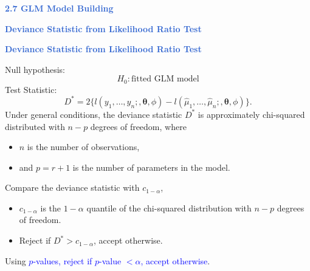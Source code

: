\documentclass[aspectratio=169,professionalfonts,mathserif]{beamer}
\newcommand{\highlight}[1]{\textcolor{Highlight}{\bf #1}}
\renewcommand{\(}{\left(}
\renewcommand{\)}{\right)}
\renewcommand{\[}{\left[}
\renewcommand{\]}{\right]}
\newcommand{\mytitle}[1]{\vspace*{-1mm}%
  \centerline{\highlight{\Large #1}}\vspace*{3mm}}
\newenvironment{slidebox}{%
  \begin{minipage}[c][7.5cm][t]{14.4cm}\raggedright}{%
  \end{minipage}}
\begin{document}
\begin{frame}\begin{slidebox}
  \mytitle{2.7 GLM Model Building}
\end{slidebox}\end{frame}

\begin{frame}\begin{slidebox}
  \mytitle{Deviance Statistic from Likelihood Ratio Test}
\end{slidebox}\end{frame}


\begin{frame}\begin{slidebox}
  \mytitle{Deviance Statistic from Likelihood Ratio Test}
  Null hypothesis: 
  $$H_0: \text{fitted GLM model} $$
  \pause
  Test Statistic:
  \begin{equation*}
    D^* = 2 \{ l(y_1, \dots, y_n;, \bm{\theta}, \phi) - l(\hat{\mu}_1, \dots, \hat{\mu}_n;, \bm{\theta}, \phi)\}\text{.} 
  \end{equation*}
  \pause
  Under general conditions, the deviance statistic $D^*$ is approximately chi-squared distributed with $n-p$ degrees of freedom, where 
  \begin{itemize}
    \item  $n$ is the number of observations,
    \item  and $p = r + 1$ is the number of parameters in the model.
  \end{itemize}
  \pause
  Compare the deviance statistic with $c_{1-\alpha}$, 
  \begin{itemize}
    \item  $c_{1-\alpha}$ is the $1-\alpha$ quantile of the chi-squared distribution with $n-p$ degrees of freedom.
    \item  Reject if $D^* > c_{1-\alpha}$, accept otherwise.
  \end{itemize}
  \pause
  Using \textcolor{blue}{$p$-values, reject if $p$-value $< \alpha$, accept otherwise}.

\end{slidebox}\end{frame}
\end{document}
